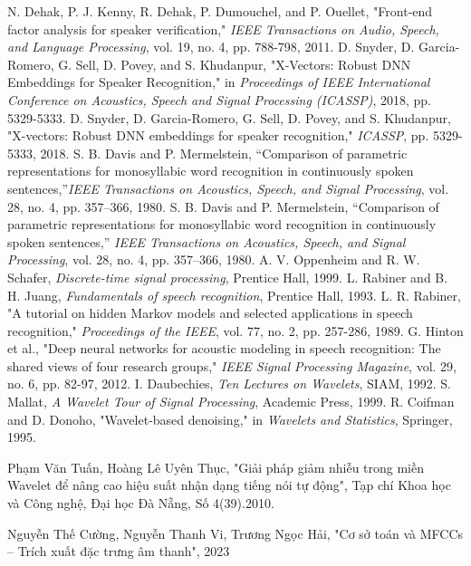 \documentclass{article}
\begin{document}
\begin{thebibliography}{9}
     N. Dehak, P. J. Kenny, R. Dehak, P. Dumouchel, and P. Ouellet, "Front-end factor analysis for speaker verification," \textit{IEEE Transactions on Audio, Speech, and Language Processing}, vol. 19, no. 4, pp. 788-798, 2011.
     D. Snyder, D. Garcia-Romero, G. Sell, D. Povey, and S. Khudanpur, "X-Vectors: Robust DNN Embeddings for Speaker Recognition," in \textit{Proceedings of IEEE International Conference on Acoustics, Speech and Signal Processing (ICASSP)}, 2018, pp. 5329-5333.
     D. Snyder, D. Garcia-Romero, G. Sell, D. Povey, and S. Khudanpur, "X-vectors: Robust DNN embeddings for speaker recognition," \textit{ICASSP}, pp. 5329-5333, 2018.
     S. B. Davis and P. Mermelstein, \textquotedblleft Comparison of parametric representations for monosyllabic word recognition in continuously spoken sentences,\textquotedblright \emph{IEEE Transactions on Acoustics, Speech, and Signal Processing}, vol. 28, no. 4, pp. 357–366, 1980.
     S. B. Davis and P. Mermelstein, ``Comparison of parametric representations for monosyllabic word recognition in continuously spoken sentences,'' \emph{IEEE Transactions on Acoustics, Speech, and Signal Processing}, vol. 28, no. 4, pp. 357–366, 1980.
     A. V. Oppenheim and R. W. Schafer, \emph{Discrete-time signal processing}, Prentice Hall, 1999.
     L. Rabiner and B. H. Juang, \emph{Fundamentals of speech recognition}, Prentice Hall, 1993.
     L. R. Rabiner, "A tutorial on hidden Markov models and selected applications in speech recognition," \textit{Proceedings of the IEEE}, vol. 77, no. 2, pp. 257-286, 1989.
     G. Hinton et al., "Deep neural networks for acoustic modeling in speech recognition: The shared views of four research groups," \textit{IEEE Signal Processing Magazine}, vol. 29, no. 6, pp. 82-97, 2012.
     I. Daubechies, \textit{Ten Lectures on Wavelets}, SIAM, 1992.
     S. Mallat, \textit{A Wavelet Tour of Signal Processing}, Academic Press, 1999.
     R. Coifman and D. Donoho, "Wavelet-based denoising," in \textit{Wavelets and Statistics}, Springer, 1995.

    Phạm Văn Tuấn, Hoàng Lê Uyên Thục, "Giải pháp giảm nhiễu trong miền Wavelet để nâng cao hiệu suất nhận dạng tiếng nói tự động", Tạp chí Khoa học và Công nghệ, Đại học Đà Nẵng, Số 4(39).2010.

    Nguyễn Thế Cường, Nguyễn Thanh Vi, Trương Ngọc Hải, "Cơ sở toán và MFCCs – Trích xuất đặc trưng âm thanh", 2023

\end{thebibliography}
\end{document}
